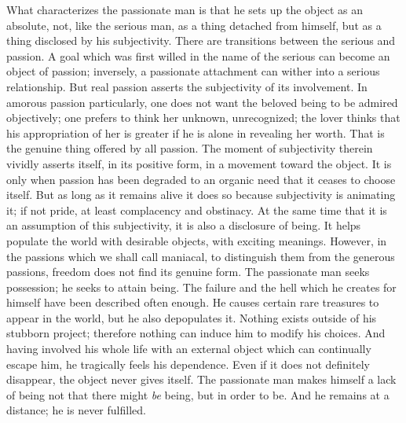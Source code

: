 \documentclass[11pt]{article}
\begin{document}
What characterizes the passionate man is that he sets up the object as an absolute, not, like the serious man, as a thing detached from himself, but as a thing disclosed by his subjectivity. There are transitions between the serious and passion. A goal which was first willed in the name of the serious can become an object of passion; inversely, a passionate attachment can wither into a serious relationship. But real passion asserts the subjectivity of its involvement. In amorous passion particularly, one does not want the beloved being to be admired objectively; one prefers to think her unknown, unrecognized; the lover thinks that his appropriation of her is greater if he is alone in revealing her worth. That is the genuine thing offered by all passion. The moment of subjectivity therein vividly asserts itself, in its positive form, in a movement toward the object. It is only when passion has been degraded to an organic need that it ceases to choose itself. But as long as it remains alive it does so because subjectivity is animating it; if not pride, at least complacency and obstinacy. At the same time that it is an assumption of this subjectivity, it is also a disclosure of being. It helps populate the world with desirable objects, with exciting meanings. However, in the passions which we shall call maniacal, to distinguish them from the generous passions, freedom does not find its genuine form. The passionate man seeks possession; he seeks to attain being. The failure and the hell which he creates for himself have been described often enough. He causes certain rare treasures to appear in the world, but he also depopulates it. Nothing exists outside of his stubborn project; therefore nothing can induce him to modify his choices. And having involved his whole life with an external object which can continually escape him, he tragically feels his dependence. Even if it does not definitely disappear, the object never gives itself. The passionate man makes himself a lack of being not that there might \textit{be} being, but in order to be. And he remains at a distance; he is never fulfilled.
\end{document}
